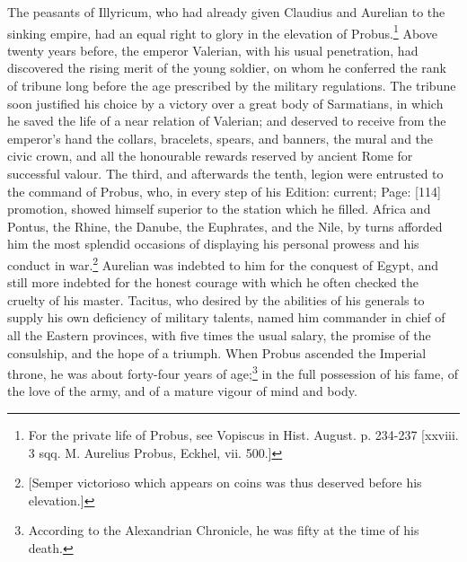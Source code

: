 The peasants of Illyricum, who had already given Claudius and Aurelian to the sinking empire, had an equal right to glory in the elevation of Probus.\footnote{For the private life of Probus, see Vopiscus in Hist. August. p. 234-237 [xxviii. 3 sqq. M. Aurelius Probus, Eckhel, vii. 500.]} Above twenty years before, the emperor Valerian, with his usual penetration, had discovered the rising merit of the young soldier, on whom he conferred the rank of tribune long before the age prescribed by the military regulations. The tribune soon justified his choice by a victory over a great body of Sarmatians, in which he saved the life of a near relation of Valerian; and deserved to receive from the emperor\texthebrew{}’s hand the collars, bracelets, spears, and banners, the mural and the civic crown, and all the honourable rewards reserved by ancient Rome for successful valour. The third, and afterwards the tenth, legion were entrusted to the command of Probus, who, in every step of his Edition: current; Page: [114] promotion, showed himself superior to the station which he filled. Africa and Pontus, the Rhine, the Danube, the Euphrates, and the Nile, by turns afforded him the most splendid occasions of displaying his personal prowess and his conduct in war.\footnote{[Semper victorioso which appears on coins was thus deserved before his elevation.]} Aurelian was indebted to him for the conquest of Egypt, and still more indebted for the honest courage with which he often checked the cruelty of his master. Tacitus, who desired by the abilities of his generals to supply his own deficiency of military talents, named him commander in chief of all the Eastern provinces, with five times the usual salary, the promise of the consulship, and the hope of a triumph. When Probus ascended the Imperial throne, he was about forty-four years of age;\footnote{According to the Alexandrian Chronicle, he was fifty at the time of his death.} in the full possession of his fame, of the love of the army, and of a mature vigour of mind and body.

